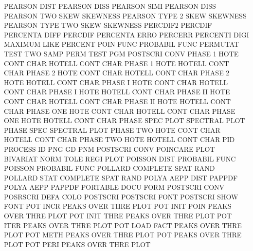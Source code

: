 PEARSON  DIST                           PEARSON  DISS
PEARSON  SIMI                           PEARSON  DISS
PEARSON  TWO  SKEW                      SKEWNESS
PEARSON  TYPE 2    SKEW                 SKEWNESS
PEARSON  TYPE TWO  SKEW                 SKEWNESS
PERCDIF2                                PERCDIF
PERCENTA DIFF                           PERCDIF
PERCENTA ERRO                           PERCERR
PERCENTI DIGI                           MAXIMUM  LIKE
PERCENT  POIN FUNC                      PROBABIL FUNC
PERMUTAT TEST                           TWO      SAMP PERM TEST
PGM                                     POSTSCRI CONV
PHASE    1    HOTE CONT CHAR            HOTELL   CONT CHAR
PHASE    1    HOTE                      HOTELL   CONT CHAR
PHASE    2    HOTE CONT CHAR            HOTELL   CONT CHAR
PHASE    2    HOTE                      HOTELL   CONT CHAR
PHASE    I    HOTE CONT CHAR            HOTELL   CONT CHAR
PHASE    I    HOTE                      HOTELL   CONT CHAR
PHASE    II   HOTE CONT CHAR            HOTELL   CONT CHAR
PHASE    II   HOTE                      HOTELL   CONT CHAR
PHASE    ONE  HOTE CONT CHAR            HOTELL   CONT CHAR
PHASE    ONE  HOTE                      HOTELL   CONT CHAR
PHASE    SPEC PLOT                      SPECTRAL PLOT
PHASE    SPEC                           SPECTRAL PLOT
PHASE    TWO  HOTE CONT CHAR            HOTELL   CONT CHAR
PHASE    TWO  HOTE                      HOTELL   CONT CHAR
PID                                     PROCESS  ID
PNG                                     GD
PNM                                     POSTSCRI CONV
POINCARE PLOT                           BIVARIAT NORM TOLE REGI PLOT
POISSON  DIST                           PROBABIL FUNC
POISSON                                 PROBABIL FUNC
POLLARD                                 COMPLETE SPAT RAND
POLLARD  STAT                           COMPLETE SPAT RAND
POLYA    AEPP DIST                      PAPPDF
POLYA    AEPP                           PAPPDF
PORTABLE DOCU FORM                      POSTSCRI CONV
POSRSCRI DEFA COLO                      POSTSCRI
POSTSCRI FONT                           POSTSCRI SHOW FONT
POT      INCR                           PEAKS    OVER THRE PLOT
POT      INIT POIN                      PEAKS    OVER THRE PLOT
POT      INIT THRE                      PEAKS    OVER THRE PLOT
POT      ITER                           PEAKS    OVER THRE PLOT
POT      LOAD FACT                      PEAKS    OVER THRE PLOT
POT      METH                           PEAKS    OVER THRE PLOT
POT                                     PEAKS    OVER THRE PLOT
POT      PERI                           PEAKS    OVER THRE PLOT
